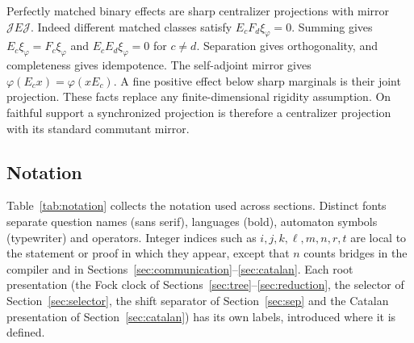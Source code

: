 Perfectly matched binary effects are sharp centralizer projections with mirror $\mathcal JE\mathcal J$. Indeed different matched classes satisfy $E_cF_d\xi_\varphi=0$. Summing gives $E_c\xi_\varphi=F_c\xi_\varphi$ and $E_cE_d\xi_\varphi=0$ for $c\ne d$. Separation gives orthogonality, and completeness gives idempotence. The self-adjoint mirror gives $\varphi(E_cx)=\varphi(xE_c)$. A fine positive effect below sharp marginals is their joint projection. These facts replace any finite-dimensional rigidity assumption. On faithful support a synchronized projection is therefore a centralizer projection with its standard commutant mirror.

\subsection{Notation}
Table~\ref{tab:notation} collects the notation used across sections. Distinct fonts separate question names (sans serif), languages (bold), automaton symbols (typewriter) and operators. Integer indices such as $i,j,k,\ell,m,n,r,t$ are local to the statement or proof in which they appear, except that $n$ counts bridges in the compiler and in Sections~\ref{sec:communication}--\ref{sec:catalan}. Each root presentation (the Fock clock of Sections~\ref{sec:tree}--\ref{sec:reduction}, the selector of Section~\ref{sec:selector}, the shift separator of Section~\ref{sec:sep} and the Catalan presentation of Section~\ref{sec:catalan}) has its own labels, introduced where it is defined.



